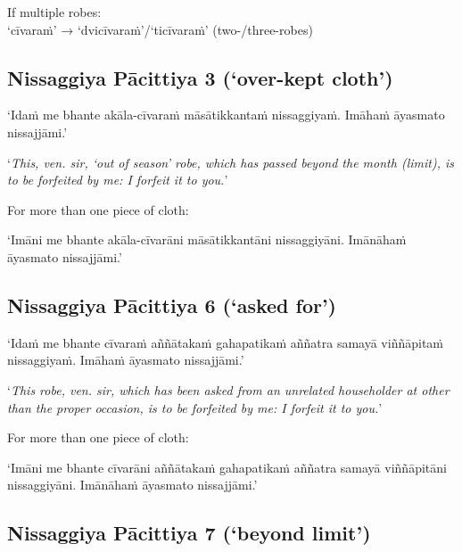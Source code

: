 If multiple robes:\\
‘cīvaraṁ’ → ‘dvicīvaraṁ’/‘ticīvaraṁ’ (two-/three-robes)

 
\subsection[NP 3 (‘over-kept cloth’)]{Nissaggiya Pācittiya 3 (‘over-kept cloth’)}

‘Idaṁ me bhante akāla-cīvaraṁ māsātikkantaṁ nissaggiyaṁ. Imāhaṁ āyasmato nissajjāmi.’

‘\emph{This, ven. sir, ‘out of season’ robe, which has passed beyond the month
  (limit), is to be forfeited by me: I forfeit it to you.}’ 

For more than one piece of cloth:

‘Imāni me bhante akāla-cīvarāni māsātikkantāni nissaggiyāni. Imānāhaṁ āyasmato nissajjāmi.’


\subsection[NP 6 (‘asked for’)]{Nissaggiya Pācittiya 6 (‘asked for’)}

‘Idaṁ me bhante cīvaraṁ aññātakaṁ gahapatikaṁ aññatra samayā viññāpitaṁ
nissaggiyaṁ. Imāhaṁ āyasmato nissajjāmi.’

‘\emph{This robe, ven. sir, which has been asked from an unrelated householder at
  other than the proper occasion, is to be forfeited by me: I forfeit it to you.}’

For more than one piece of cloth:

‘Imāni me bhante cīvarāni aññātakaṁ gahapatikaṁ aññatra samayā viññāpitāni
nissaggiyāni. Imānāhaṁ āyasmato nissajjāmi.’


\subsection[NP 7 (‘beyond limit’)]{Nissaggiya Pācittiya 7 (‘beyond limit’)}

